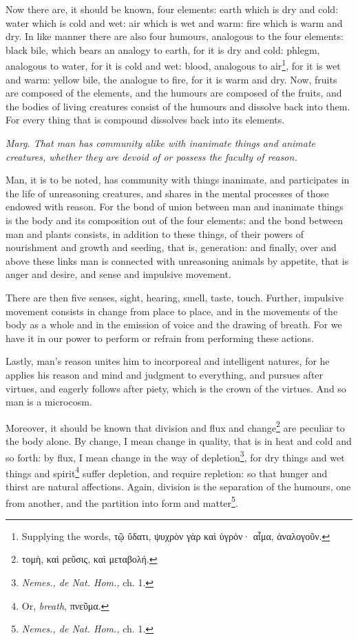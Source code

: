 Now there are, it should be known, four elements: earth which is dry and cold: water which is cold and wet: air which is wet and warm: fire which is warm and dry. In like manner there are also four humours, analogous to the four elements: black bile, which bears an analogy to earth, for it is dry and cold: phlegm, analogous to water, for it is cold and wet: blood, analogous to air\footnote{Supplying the words, \textgreek{τῷ ὕδατι, ψυχρὸν γὰρ καὶ ὑγρόν· αἷμα, ἀναλογοῦν}.}, for it is wet and warm: yellow bile, the analogue to fire, for it is warm and dry. Now, fruits are composed of the elements, and the humours are composed of the fruits, and the bodies of living creatures consist of the humours and dissolve back into them. For every thing that is compound dissolves back into its elements.

\emph{Marg. That man has community alike with inanimate things and animate creatures, whe}\emph{ther they are devoid of or possess the faculty of reason.}

Man, it is to be noted, has community with things inanimate, and participates in the life of unreasoning creatures, and shares in the mental processes of those endowed with reason. For the bond of union between man and inanimate things is the body and its composition out of the four elements: and the bond between man and plants consists, in addition to these things, of their powers of nourishment and growth and seeding, that is, generation: and finally, over and above these links man is connected with unreasoning animals by appetite, that is anger and desire, and sense and impulsive movement.

There are then five senses, sight, hearing, smell, taste, touch. Further, impulsive movement consists in change from place to place, and in the movements of the body as a whole and in the emission of voice and the drawing of breath. For we have it in our power to perform or refrain from performing these actions.

Lastly, man’s reason unites him to incorporeal and intelligent natures, for he applies his reason and mind and judgment to everything, and pursues after virtues, and eagerly follows after piety, which is the crown of the virtues. And so man is a microcosm.

Moreover, it should be known that division and flux and change\footnote{\textgreek{τομὴ, καὶ ρεῦσις, καὶ μεταβολή}.} are peculiar to the body alone. By change, I mean change in quality, that is in heat and cold and so forth: by flux, I mean change in the way of depletion\footnote{\emph{Nemes., de Nat. Hom., }ch. 1.}, for dry things and wet things and spirit\footnote{Or, \emph{breath}, \textgreek{πνεῦμα}.} suffer depletion, and require repletion: so that hunger and thirst are natural affections. Again, division is the separation of the humours, one from another, and the partition into form and matter\footnote{\emph{Nemes., de Nat. Hom., }ch. 1.}.

